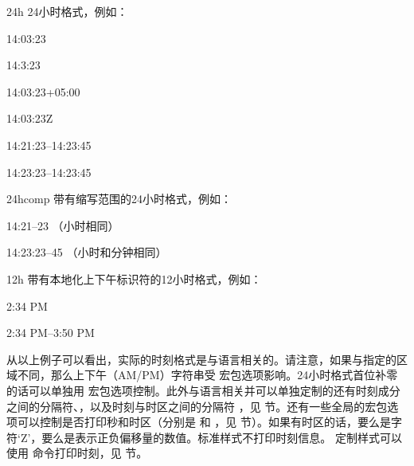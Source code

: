 \begin{optionlist}
\begin{valuelist}
	\item[24h] %
	24小时格式，例如：\par
	14:03:23\par
	14:3:23\par
	14:03:23+05:00\par
	14:03:23Z\par
	14:21:23--14:23:45\par
	14:23:23--14:23:45\par
	\item[24hcomp] %
	带有缩写范围的24小时格式，例如：\par
	14:21--23 （小时相同）\par %
	14:23:23--45 （小时和分钟相同）\par %
	\item[12h] %
	带有本地化上下午标识符的12小时格式，例如：\par
	2:34 PM\par
	2:34 PM--3:50 PM\par
\end{valuelist}
%
从以上例子可以看出，实际的时刻格式是与语言相关的。请注意，如果与指定的区域不同，那么上下午（AM/PM）字符串受  宏包选项影响。24小时格式首位补零的话可以单独用  宏包选项控制。此外与语言相关并可以单独定制的还有时刻成分之间的分隔符、，以及时刻与时区之间的分隔符 ，见  节。还有一些全局的宏包选项可以控制是否打印秒和时区（分别是  和 ，见  节）。如果有时区的话，要么是字符`Z'，要么是表示正负偏移量的数值。标准样式不打印时刻信息。
定制样式可以使用  命令打印时刻，见  节。


\end{optionlist}
